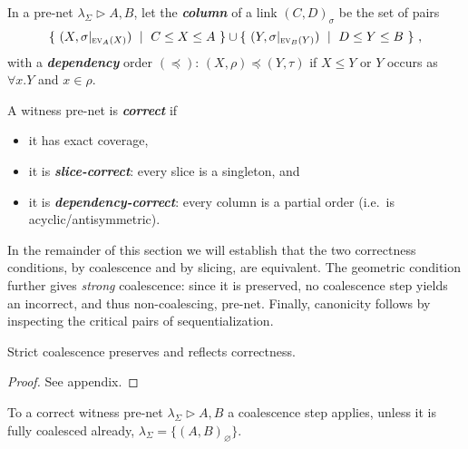 \documentclass[UKenglish]{lipics-v2016}
\theoremstyle{plain}
\newcommand\defn[1]{\textit{\textbf{#1}}}
\newcommand\ex[2][{}]{\textsc{ev}_{#1}(#2)}
\newcommand\+{+}
\renewcommand\*{\times}
\newcommand\sub{\leq}
\newcommand\dep{\preccurlyeq}
\newcommand\net[3]{#1\triangleright #2,#3}
\newcommand\res[1]{|_{#1}}
\newcommand\link[3][\sigma]{(#2,#3)_{#1}}
\begin{document}
\begin{definition}
In a pre-net $\net{\lambda_\Sigma}AB$, let the \defn{column} of a link $\link CD$ be the set of pairs 
\[
	\{~(X,\sigma\res{\ex[A]X})~\mid~C\sub X\sub A~\}\cup\{~(Y,\sigma\res{\ex[B]Y})~\mid~D\sub Y\sub B~\}~,
\]
with a \defn{dependency} order $(\dep)$: $(X,\rho)\dep(Y,\tau)$ if $X\leq Y$ or $Y$ occurs as $\forall x.Y$ and $x\in\rho$.
\end{definition}

\begin{definition}
A witness pre-net is \defn{correct} if
\begin{itemize}
\item it has exact coverage,
\item it is \defn{slice-correct}: every slice is a singleton, and
\item it is \defn{dependency-correct}: every column is a partial order (i.e.\ is acyclic/antisymmetric).
\end{itemize}
\end{definition}

In the remainder of this section we will establish that the two correctness conditions, by coalescence and by slicing, are equivalent. The geometric condition further gives \emph{strong} coalescence: since it is preserved, no coalescence step yields an incorrect, and thus non-coalescing, pre-net. Finally, canonicity follows by inspecting the critical pairs of sequentialization.

\setcounter{lemcorrect}{\thetheorem}
\begin{lemma}
\label{lem:correct}
Strict coalescence preserves and reflects correctness.
\end{lemma}

\begin{proof}
See appendix.
\end{proof}


\setcounter{lemcoalescenceapplies}{\thetheorem}
\begin{lemma}
\label{lem:coalescence applies}
To a correct witness pre-net $\net{\lambda_\Sigma}AB$ a coalescence step applies, unless it is fully coalesced already, $\lambda_\Sigma=\{\link[\varnothing]AB\}$.
\end{lemma}
\end{document}
